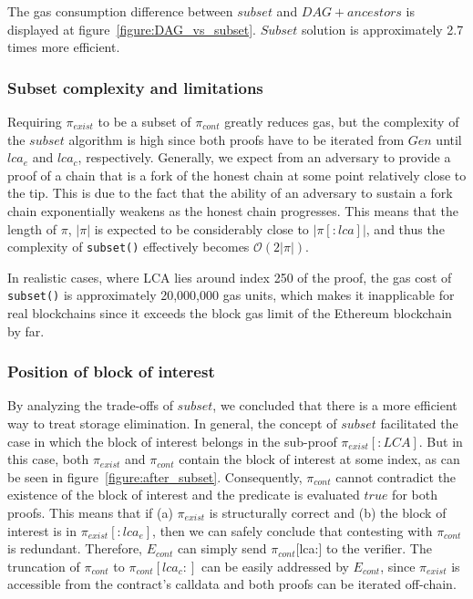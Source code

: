 



The gas consumption difference between $subset$ and $DAG+ancestors$ is
displayed at figure~\ref{figure:DAG_vs_subset}. $Subset$ solution is
approximately 2.7 times more efficient.



\subsubsection{Subset complexity and limitations}

Requiring $\pi_{exist}$ to be a subset of $\pi_{cont}$ greatly reduces gas, but
the complexity of the $subset$ algorithm is high since both proofs have to be
iterated from $Gen$ until $lca_e$ and $lca_c$, respectively. Generally, we
expect from an adversary to provide a proof of a chain that is a fork of the
honest chain at some point relatively close to the tip. This is due to the fact
that the ability of an adversary to sustain a fork chain exponentially weakens
as the honest chain progresses. This means that the length of $\pi$, $|\pi|$ is
expected to be considerably close to $|\pi[:lca]|$, and thus the complexity of
\texttt{subset()} effectively becomes $\mathcal{O}(2|\pi|)$.

In realistic cases, where LCA lies around index 250 of the proof, the gas cost
of \texttt{subset()} is approximately 20,000,000 gas units, which makes it
inapplicable for real blockchains since it exceeds the block gas limit of the
Ethereum blockchain by far.

\subsubsection{Position of block of interest}

By analyzing the trade-offs of $subset$, we concluded that there is a more
efficient way to treat storage elimination. In general, the concept of $subset$
facilitated the case in which the block of interest belongs in the sub-proof
$\pi_{exist}[:LCA]$. But in this case, both $\pi_{exist}$ and $\pi_{cont}$
contain the block of interest at some index, as can be seen in
figure~\ref{figure:after_subset}. Consequently, $\pi_{cont}$ cannot contradict
the existence of the block of interest and the predicate is evaluated $true$
for both proofs. This means that if (a) $\pi_{exist}$ is structurally correct
and (b) the block of interest is in $\pi_{exist}[:lca_{e}]$, then we can safely
conclude that contesting with $\pi_{cont}$ is redundant. Therefore,
$E_{cont}$ can simply send $\pi_{cont}$[lca:] to the verifier. The
truncation of $\pi_{cont}$ to $\pi_{cont}[lca_{c}:]$ can be easily addressed
by $E_{cont}$, since $\pi_{exist}$ is accessible from the contract's calldata
and both proofs can be iterated off-chain.

